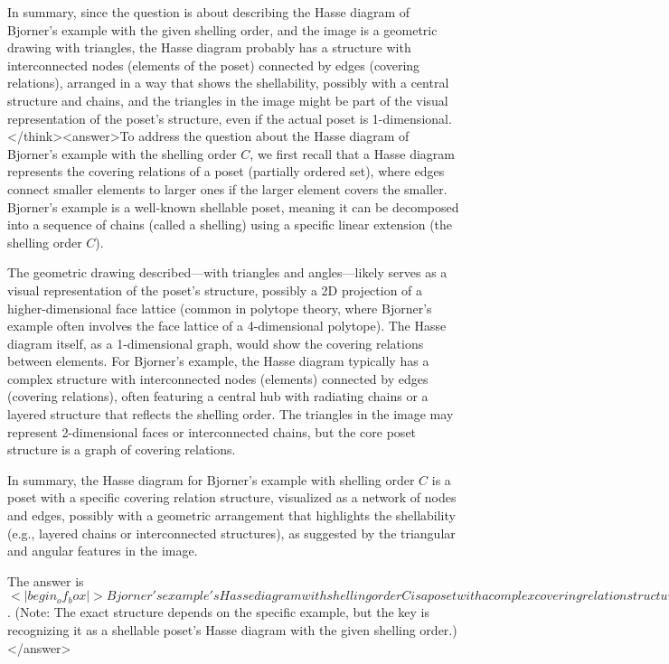 In summary, since the question is about describing the Hasse diagram of Bjorner's example with the given shelling order, and the image is a geometric drawing with triangles, the Hasse diagram probably has a structure with interconnected nodes (elements of the poset) connected by edges (covering relations), arranged in a way that shows the shellability, possibly with a central structure and chains, and the triangles in the image might be part of the visual representation of the poset's structure, even if the actual poset is 1-dimensional.</think><answer>To address the question about the Hasse diagram of Bjorner's example with the shelling order \( C \), we first recall that a Hasse diagram represents the covering relations of a poset (partially ordered set), where edges connect smaller elements to larger ones if the larger element covers the smaller. Bjorner's example is a well-known shellable poset, meaning it can be decomposed into a sequence of chains (called a shelling) using a specific linear extension (the shelling order \( C \)).

The geometric drawing described—with triangles and angles—likely serves as a visual representation of the poset's structure, possibly a 2D projection of a higher-dimensional face lattice (common in polytope theory, where Bjorner's example often involves the face lattice of a 4-dimensional polytope). The Hasse diagram itself, as a 1-dimensional graph, would show the covering relations between elements. For Bjorner's example, the Hasse diagram typically has a complex structure with interconnected nodes (elements) connected by edges (covering relations), often featuring a central hub with radiating chains or a layered structure that reflects the shelling order. The triangles in the image may represent 2-dimensional faces or interconnected chains, but the core poset structure is a graph of covering relations.

In summary, the Hasse diagram for Bjorner's example with shelling order \( C \) is a poset with a specific covering relation structure, visualized as a network of nodes and edges, possibly with a geometric arrangement that highlights the shellability (e.g., layered chains or interconnected structures), as suggested by the triangular and angular features in the image.

The answer is \(<|begin_of_box|>Bjorner's example's Hasse diagram with shelling order C is a poset with a complex covering relation structure, typically visualized as a network of interconnected nodes and edges (possibly with layered or chain-like arrangements), reflecting the shellability of the poset.<|end_of_box|>\). (Note: The exact structure depends on the specific example, but the key is recognizing it as a shellable poset's Hasse diagram with the given shelling order.)</answer>